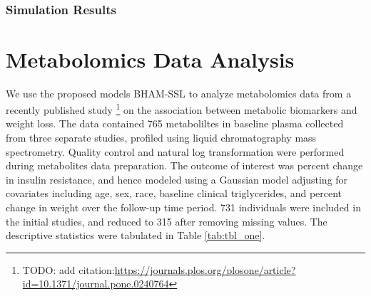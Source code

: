 \documentclass[AMA,STIX1COL,]{WileyNJD-v2}
\begin{document}
~

\hypertarget{simulation-results}{%
\subsubsection{Simulation Results}\label{simulation-results}}

\hypertarget{metabolomics-data-analysis}{%
\section{Metabolomics Data Analysis}\label{metabolomics-data-analysis}}

We use the proposed models BHAM-SSL to analyze metabolomics data from a
recently published study \footnote{TODO: add
  citation:\url{https://journals.plos.org/plosone/article?id=10.1371/journal.pone.0240764}}
on the association between metabolic biomarkers and weight loss. The
data contained 765 metaboliltes in baseline plasma collected from three
separate studies, profiled using liquid chromatography mass
spectrometry. Quality control and natural log transformation were
performed during metabolites data preparation. The outcome of interest
was percent change in insulin resistance, and hence modeled using a
Gaussian model adjusting for covariates including age, sex, race,
baseline clinical triglycerides, and percent change in weight over the
follow-up time period. 731 individuals were included in the initial
studies, and reduced to 315 after removing missing values. The
descriptive statistics were tabulated in Table \ref{tab:tbl_one}.

\providecommand{\docline}[3]{\noalign{\global\setlength{\arrayrulewidth}{#1}}\arrayrulecolor[HTML]{#2}\cline{#3}}

\setlength{\tabcolsep}{2pt}

\renewcommand*{\arraystretch}{1.5}
\end{document}
